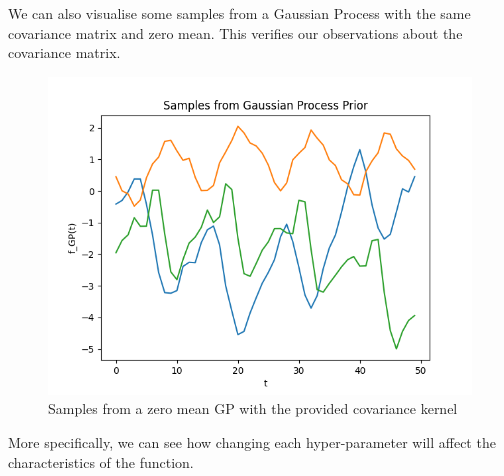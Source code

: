 \documentclass[12pt]{article}
\begin{document}
We can also visualise some samples from a Gaussian Process with the same covariance matrix and zero mean.
This verifies our observations about the covariance matrix.

\begin{figure}[h]
\centering
\includegraphics[scale=0.5]{outputs/q2/c-samples}
\caption{Samples from a zero mean GP with the provided covariance kernel}
\label{fig:c-samples}
\end{figure}

\newpage
More specifically, we can see how changing each hyper-parameter will affect the characteristics of the function.
\end{document}
